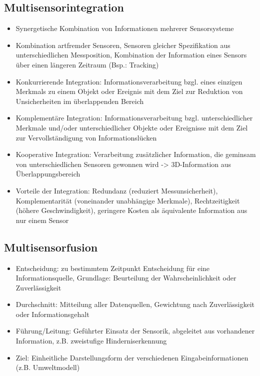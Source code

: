 \documentclass[paper=a4, fontsize=11pt]{scrartcl} %
\numberwithin{equation}{section} %
\numberwithin{figure}{section} %
\numberwithin{table}{section} %
\begin{document}
\subsection{Multisensorintegration}

\begin{itemize}
\item Synergetische Kombination von Informationen mehrerer Sensorsysteme
\item Kombination artfremder Sensoren, Sensoren gleicher Spezifikation aus unterschiedlichen Messposition, Kombination der Information eines Sensors über einen längeren Zeitraum (Bsp.: Tracking)
\item Konkurrierende Integration: Informationsverarbeitung bzgl. eines einzigen Merkmals zu einem Objekt oder Ereignis mit dem Ziel zur Reduktion von Unsicherheiten im überlappenden Bereich
\item Komplementäre Integration: Informationsverarbeitung bzgl. unterschiedlicher Merkmale und/oder unterschiedlicher Objekte oder Ereignisse mit dem Ziel zur Vervollständigung von Informationslücken
\item Kooperative Integration: Verarbeitung zusätzlicher Information, die geminsam von unterschiedlichen Sensoren gewonnen wird -> 3D-Information aus Überlappungsbereich
\item Vorteile der Integration: Redundanz (reduziert Messunsicherheit), Komplementarität (voneinander unabhängige Merkmale), Rechtzeitigkeit (höhere Geschwindigkeit), geringere Kosten als äquivalente Information aus nur einem Sensor
\end{itemize}

\subsection{Multisensorfusion}

\begin{itemize}
\item Entscheidung: zu bestimmtem Zeitpunkt Entscheidung für eine Informationsquelle, Grundlage: Beurteilung der Wahrscheinlichkeit oder Zuverlässigkeit
\item Durchschnitt: Mitteilung aller Datenquellen, Gewichtung nach Zuverlässigkeit oder Informationsgehalt
\item Führung/Leitung: Geführter Einsatz der Sensorik, abgeleitet aus vorhandener Information, z.B. zweistufige Hinderniserkennung
\item Ziel: Einheitliche Darstellungsform der verschiedenen Eingabeinformationen (z.B. Umweltmodell)
\end{itemize}
\end{document}
